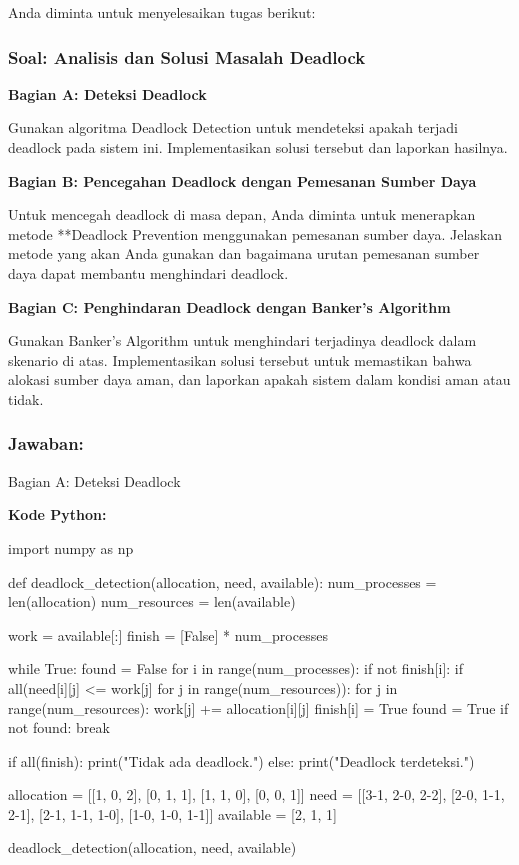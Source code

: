 \documentclass[12pt]{article}
\begin{document}
Anda diminta untuk menyelesaikan tugas berikut:

\subsubsection{Soal: Analisis dan Solusi Masalah Deadlock}

\textbf{Bagian A: Deteksi Deadlock}

Gunakan algoritma Deadlock Detection untuk mendeteksi apakah terjadi deadlock pada sistem ini. Implementasikan solusi tersebut dan laporkan hasilnya.

\textbf{Bagian B: Pencegahan Deadlock dengan Pemesanan Sumber Daya}

Untuk mencegah deadlock di masa depan, Anda diminta untuk menerapkan metode **Deadlock Prevention menggunakan pemesanan sumber daya. Jelaskan metode yang akan Anda gunakan dan bagaimana urutan pemesanan sumber daya dapat membantu menghindari deadlock.

\textbf{Bagian C: Penghindaran Deadlock dengan Banker's Algorithm}

Gunakan Banker's Algorithm untuk menghindari terjadinya deadlock dalam skenario di atas. Implementasikan solusi tersebut untuk memastikan bahwa alokasi sumber daya aman, dan laporkan apakah sistem dalam kondisi aman atau tidak.

\subsubsection{Jawaban:}

Bagian A: Deteksi Deadlock

\textbf{Kode Python:}

\begin{python}
import numpy as np

def deadlock_detection(allocation, need, available):
    num_processes = len(allocation)
    num_resources = len(available)
    
    work = available[:]
    finish = [False] * num_processes
    
    while True:
        found = False
        for i in range(num_processes):
            if not finish[i]:
                if all(need[i][j] <= work[j] for j in range(num_resources)):
                    for j in range(num_resources):
                        work[j] += allocation[i][j]
                    finish[i] = True
                    found = True
        if not found:
            break
    
    if all(finish):
        print("Tidak ada deadlock.")
    else:
        print("Deadlock terdeteksi.")

allocation = [[1, 0, 2], [0, 1, 1], [1, 1, 0], [0, 0, 1]]
need = [[3-1, 2-0, 2-2], [2-0, 1-1, 2-1], [2-1, 1-1, 1-0], [1-0, 1-0, 1-1]]
available = [2, 1, 1]

deadlock_detection(allocation, need, available)
\end{python}
\end{document}
